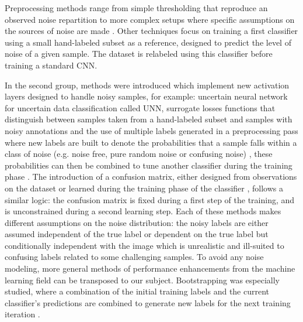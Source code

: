 \documentclass[a4paper]{article}
\begin{document}
    Preprocessing methods range from simple thresholding that reproduce an observed noise repartition to more complex setups where specific assumptions on the sources of noise are made \cite{frenay2014classification}. Other techniques focus on training a first classifier using a small hand-labeled subset as a reference, designed to predict the level of noise of a given sample. The dataset is relabeled using this classifier before training a standard CNN.

    In the second group, methods were introduced which implement new activation layers designed to handle noisy samples, for example: uncertain neural network for uncertain data classification called UNN\cite{ge2010unn}, surrogate losses functions that distinguish between samples taken from a hand-labeled subset and samples with noisy annotations \cite{NIPS2013_5073} and the use of multiple labels generated in a preprocessing pass where new labels are built to denote the probabilities that a sample falls within a class of noise (e.g. noise free, pure random noise or confusing noise) , these probabilities can then be combined to tune another classifier during the training phase \cite{xiao2015learning}.
    The introduction of a confusion matrix, either designed from observations on the dataset or learned during the training phase of the classifier \cite{Sukhbaatar:Qk8RHYrX}, follows a similar logic: the confusion matrix is fixed during a first step of the training, and is unconstrained during a second learning step.
    Each of these methods makes different assumptions on the noise distribution: the noisy labels are either assumed independent of the true label \cite{larsen1998design} or dependent on the true label but conditionally independent with the image\cite{Sukhbaatar:Qk8RHYrX} which is unrealistic and ill-suited to confusing labels related to some challenging samples. 
    To avoid any noise modeling, more general methods of performance enhancements from the machine learning field can be transposed to our subject. Bootstrapping was especially studied, where a combination of the initial training labels and the current classifier’s predictions are combined to generate new labels for the next training iteration \cite{Reed:MnuVRqvK}.

     
      
\end{document}
